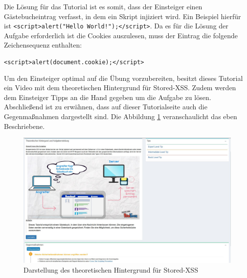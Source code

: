 Die Lösung für das Tutorial ist es somit, dass der Einsteiger einen Gästebucheintrag verfasst, in dem ein Skript injiziert wird. Ein Beispiel hierfür ist \colorbox{altgray}{\lstinline|<script>alert("Hello World!");</script>|}. Da es für die Lösung der Aufgabe erforderlich ist die Cookies auszulesen, muss der Eintrag die folgende Zeichensequenz enthalten: 
\begin{center} 
\colorbox{altgray}{\lstinline|<script>alert(document.cookie);</script>|} 
\end{center}

Um den Einsteiger optimal auf die Übung vorzubereiten, besitzt dieses Tutorial ein Video mit dem theoretischen Hintergrund für Stored-XSS. Zudem werden dem Einsteiger Tipps an die Hand gegeben um die Aufgabe zu lösen. Abschließend ist zu erwähnen, dass auf dieser Tutorialseite auch die Gegenmaßnahmen dargestellt sind. Die Abbildung \ref{fig:stored-xss-theorie} veranschaulicht das eben Beschriebene. 

\begin{figure}[H]
	\centering
	\includegraphics[width=\textwidth]{images/XSS/stored-xss-theorie.jpg}
	\caption{Darstellung des theoretischen Hintergrund für Stored-XSS}
	\label{fig:stored-xss-theorie}
\end{figure}

